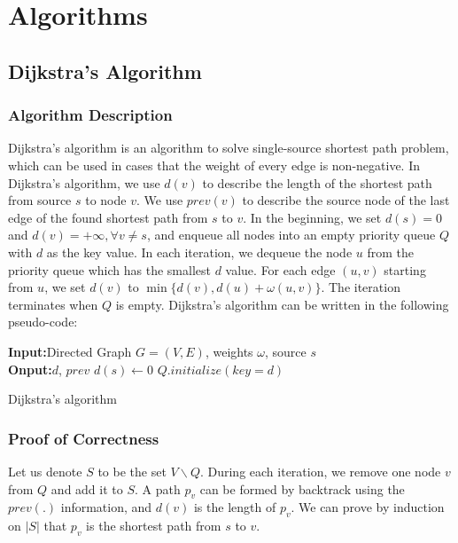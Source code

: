 \documentclass[a4paper, margin=15in]{article}
\renewcommand{\KwData}{\textbf{Input:}}
\renewcommand{\KwResult}{\textbf{Onput:}}
\begin{document}
\section{Algorithms}

\subsection{Dijkstra's Algorithm}
\subsubsection{Algorithm Description}
Dijkstra's algorithm is an algorithm to solve single-source shortest path problem, which can be used in cases that the weight of every edge is non-negative. In Dijkstra's algorithm, we use $d(v)$ to describe the length of the shortest path from source $s$ to node $v$. We use $prev(v)$ to describe the source node of the last edge of the found shortest path from $s$ to $v$. In the beginning, we set $d(s)=0$ and $d(v) = +\infty , \forall v \neq s$, and enqueue all nodes into an empty priority queue $Q$ with $d$ as the key value. In each iteration, we dequeue the node $u$ from the priority queue which has the smallest $d$ value. For each edge $(u,v)$ starting from $u$, we set $d(v)$ to $\min\{d(v),d(u)+\omega(u,v)\}$. The iteration terminates when $Q$ is empty. Dijkstra's algorithm can be written in the following pseudo-code:

\begin{algorithm}[H]
 \KwData{Directed Graph $G=(V,E)$, weights $\omega$, source $s$}\\
 \KwResult{$d$, $prev$}\;
 $d(s) \gets 0$\;
 $Q.initialize(key = d)$\;
 \caption{Dijkstra's algorithm}
\end{algorithm}

\subsubsection{Proof of Correctness}
Let us denote $S$ to be the set $V \backslash Q $. During each iteration, we remove one node $v$ from $Q$ and add it to $S$. A path $p_v$ can be formed by backtrack using the $prev(.)$ information, and $d(v)$ is the length of $p_v$. We can prove by induction on $\vert S \vert$ that $p_v$ is the shortest path from $s$ to $v$.
\end{document}
